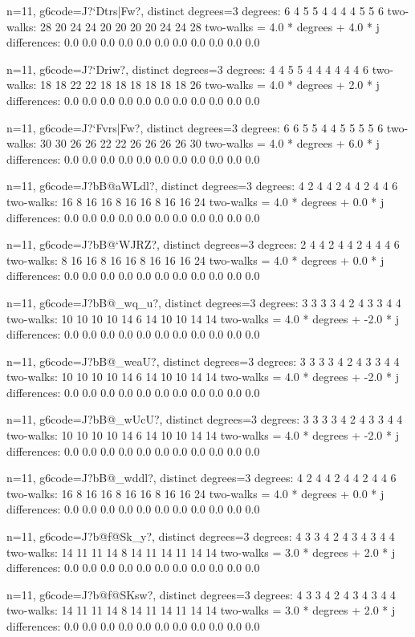 {{{{{{{{{n=11, g6code=J?`Dtrs|Fw?, distinct degrees=3
degrees: 6 4 5 5 4 4 4 4 5 5 6 
two-walks: 28 20 24 24 20 20 20 20 24 24 28 
two-walks = 4.0 * degrees + 4.0 * j
differences: 0.0 0.0 0.0 0.0 0.0 0.0 0.0 0.0 0.0 0.0 0.0 

n=11, g6code=J?`Driw\Fw?, distinct degrees=3
degrees: 4 4 5 5 4 4 4 4 4 4 6 
two-walks: 18 18 22 22 18 18 18 18 18 18 26 
two-walks = 4.0 * degrees + 2.0 * j
differences: 0.0 0.0 0.0 0.0 0.0 0.0 0.0 0.0 0.0 0.0 0.0 

n=11, g6code=J?`Fvrs|Fw?, distinct degrees=3
degrees: 6 6 5 5 4 4 5 5 5 5 6 
two-walks: 30 30 26 26 22 22 26 26 26 26 30 
two-walks = 4.0 * degrees + 6.0 * j
differences: 0.0 0.0 0.0 0.0 0.0 0.0 0.0 0.0 0.0 0.0 0.0 

n=11, g6code=J?bB@aWLdl?, distinct degrees=3
degrees: 4 2 4 4 2 4 4 2 4 4 6 
two-walks: 16 8 16 16 8 16 16 8 16 16 24 
two-walks = 4.0 * degrees + 0.0 * j
differences: 0.0 0.0 0.0 0.0 0.0 0.0 0.0 0.0 0.0 0.0 0.0 

n=11, g6code=J?bB@`WJRZ?, distinct degrees=3
degrees: 2 4 4 2 4 4 2 4 4 4 6 
two-walks: 8 16 16 8 16 16 8 16 16 16 24 
two-walks = 4.0 * degrees + 0.0 * j
differences: 0.0 0.0 0.0 0.0 0.0 0.0 0.0 0.0 0.0 0.0 0.0 

n=11, g6code=J?bB@_wq_u?, distinct degrees=3
degrees: 3 3 3 3 4 2 4 3 3 4 4 
two-walks: 10 10 10 10 14 6 14 10 10 14 14 
two-walks = 4.0 * degrees + -2.0 * j
differences: 0.0 0.0 0.0 0.0 0.0 0.0 0.0 0.0 0.0 0.0 0.0 

n=11, g6code=J?bB@_weaU?, distinct degrees=3
degrees: 3 3 3 3 4 2 4 3 3 4 4 
two-walks: 10 10 10 10 14 6 14 10 10 14 14 
two-walks = 4.0 * degrees + -2.0 * j
differences: 0.0 0.0 0.0 0.0 0.0 0.0 0.0 0.0 0.0 0.0 0.0 

n=11, g6code=J?bB@_wUcU?, distinct degrees=3
degrees: 3 3 3 3 4 2 4 3 3 4 4 
two-walks: 10 10 10 10 14 6 14 10 10 14 14 
two-walks = 4.0 * degrees + -2.0 * j
differences: 0.0 0.0 0.0 0.0 0.0 0.0 0.0 0.0 0.0 0.0 0.0 

n=11, g6code=J?bB@_wddl?, distinct degrees=3
degrees: 4 2 4 4 2 4 4 2 4 4 6 
two-walks: 16 8 16 16 8 16 16 8 16 16 24 
two-walks = 4.0 * degrees + 0.0 * j
differences: 0.0 0.0 0.0 0.0 0.0 0.0 0.0 0.0 0.0 0.0 0.0 

n=11, g6code=J?b@f@Sk_y?, distinct degrees=3
degrees: 4 3 3 4 2 4 3 4 3 4 4 
two-walks: 14 11 11 14 8 14 11 14 11 14 14 
two-walks = 3.0 * degrees + 2.0 * j
differences: 0.0 0.0 0.0 0.0 0.0 0.0 0.0 0.0 0.0 0.0 0.0 

n=11, g6code=J?b@f@SKsw?, distinct degrees=3
degrees: 4 3 3 4 2 4 3 4 3 4 4 
two-walks: 14 11 11 14 8 14 11 14 11 14 14 
two-walks = 3.0 * degrees + 2.0 * j
differences: 0.0 0.0 0.0 0.0 0.0 0.0 0.0 0.0 0.0 0.0 0.0 

}}}}}}}}}
